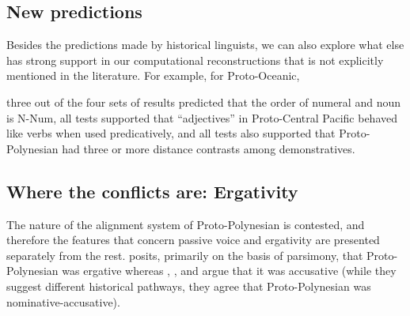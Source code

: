 \documentclass[a4paper,10pt]{article} %
\begin{document}
%
%

\subsection{New predictions}
Besides the predictions made by historical linguists, we can also explore what else has strong support in our computational reconstructions that is not explicitly mentioned in the literature. For example, for Proto-Oceanic, 

three out of the four sets of results predicted that the order of numeral and noun is N-Num, all tests supported that ``adjectives'' in Proto-Central Pacific behaved like verbs when used predicatively, and all tests also supported that Proto-Polynesian had three or more distance contrasts among demonstratives. 

\subsection{Where the conflicts are: Ergativity}
The nature of the alignment system of Proto-Polynesian is contested, and therefore the features that concern passive voice and ergativity are presented separately from the rest. \citet{clark1976aspects} posits, primarily on the basis of parsimony, that Proto-Polynesian was ergative whereas \citet{hale_1968}, \citet{hohepa_1967,hohepa_1969}, and \citet{chung1978} argue that it was accusative (while they suggest different historical pathways, they agree that Proto-Polynesian was nominative-accusative).
\end{document}
